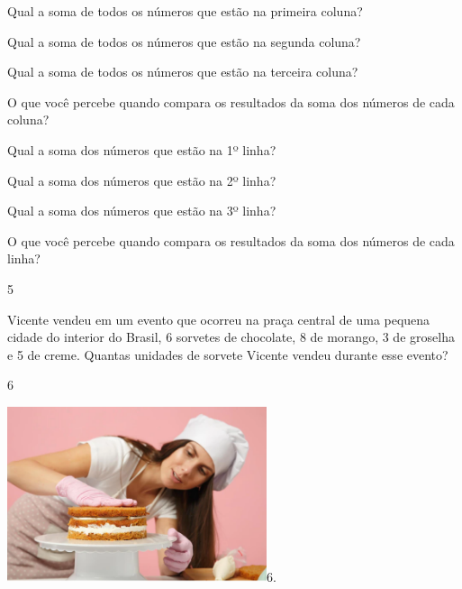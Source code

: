 \begin{escolha}

\item
  Qual a soma de todos os números que estão na primeira coluna?

\item
  Qual a soma de todos os números que estão na segunda coluna?

\item
  Qual a soma de todos os números que estão na terceira coluna?

\item
  O que você percebe quando compara os resultados da soma dos números de
  cada coluna?

\item
  Qual a soma dos números que estão na 1º linha?

\item
  Qual a soma dos números que estão na 2º linha?

\item
  Qual a soma dos números que estão na 3º linha?

\item
  O que você percebe quando compara os resultados da soma dos números de
  cada linha?
\end{escolha}

\num{5}

Vicente vendeu em um evento que ocorreu na praça central de uma pequena
cidade do interior do Brasil, 6 sorvetes de chocolate, 8 de morango, 3
de groselha e 5 de creme. Quantas unidades de sorvete Vicente vendeu
durante esse evento?


\num{6}

{\texorpdfstring{\protect\includegraphics[width=3.00000in,height=2.02528in]{media/image22.png}6.
}{6. }}\label{section-21}


